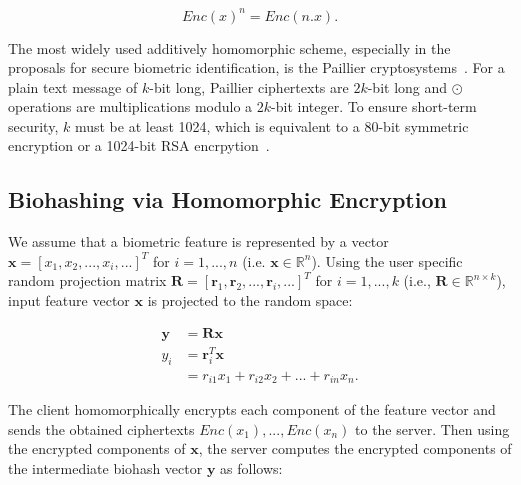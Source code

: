 \documentclass[conference]{IEEEtran}
\begin{document}
\begin{equation}
Enc(x)^n = Enc(n.x).
\label{eqn5}
\end{equation}

The most widely used additively homomorphic scheme, especially in the proposals for secure biometric identification, is the Paillier cryptosystems~\cite{Paillier99}. For a plain text message of $k$-bit long, Paillier ciphertexts are $2k$-bit long and $\odot$ operations are multiplications modulo a $2k$-bit integer. To ensure short-term security, $k$ must be at least 1024, which is equivalent to a 80-bit symmetric encryption or a 1024-bit RSA encrpytion~\cite{Bringer2013}.


\subsection{Biohashing via Homomorphic Encryption}

We assume that a biometric feature is represented by a vector $\mathbf{x}=[x_1, x_2, ..., x_i, ...]^T$ for $i=1,...,n$ (i.e. $\mathbf{x}\in\mathbb{R}^n$). Using the user specific random projection matrix $\mathbf{R}=[\mathbf{r}_1, \mathbf{r}_2, ..., \mathbf{r}_i, ...]^T$ for $i=1,...,k$ (i.e., $\mathbf{R}\in\mathbb{R}^{n\times k}$), input feature vector $\mathbf{x}$ is projected to the random space:


\begin{align}
\mathbf{y}& =\mathbf{R}\mathbf{x}\\
y_i& =\mathbf{r}_i^T\mathbf{x}\\
&=r_{i1}x_1+r_{i2}x_2+...+r_{in}x_n.
\label{eqn6}
\end{align}

The client homomorphically encrypts each component of the feature vector and sends the obtained ciphertexts $Enc(x_1),...,Enc(x_n)$ to the server. Then using the encrypted components of $\mathbf{x}$, the server computes the encrypted components of the intermediate biohash vector $\mathbf{y}$ as follows:

\end{document}

